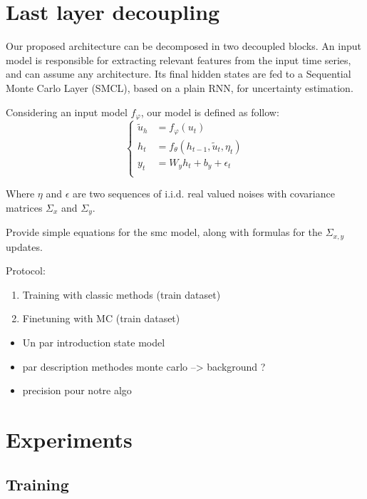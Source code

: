 \documentclass{article}
\begin{document}
\section{Last layer decoupling}
\label{sec:decoupling}
Our proposed architecture can be decomposed in two decoupled blocks.
An input model is responsible for extracting relevant features from the input time series, and can assume any architecture.
Its final hidden states are fed to a Sequential Monte Carlo Layer (SMCL), based on a plain RNN, for uncertainty estimation.

Considering an input model $f_\varphi$, our model is defined as follow:
\begin{equation*}
	\left\{
	\begin{aligned}
		\tilde u_h & = f_\varphi(u_t)                                     \\
		h_t        & = f_\theta(h_{t-1}, \tilde u_t, \eta_t) \\
		y_t        & = W_y h_t + b_y + \epsilon_t                         \\
	\end{aligned}
	\right.
\end{equation*}

Where $\eta$ and $\epsilon$ are two sequences of i.i.d. real valued noises with covariance matrices $\Sigma_x$ and $\Sigma_y$.

Provide simple equations for the smc model, along with formulas for the $\Sigma_{x, y}$ updates.

Protocol:
\begin{enumerate}
	\item Training with classic methods (train dataset)
	\item Finetuning with MC (train dataset)
\end{enumerate}

\begin{itemize}
	\item Un par introduction state model
	\item par description methodes monte carlo --> background ?
	\item precision pour notre algo
\end{itemize}

\section{Experiments}
\label{sec:exp}

\subsection{Training}%
\label{sub:training}
\end{document}
